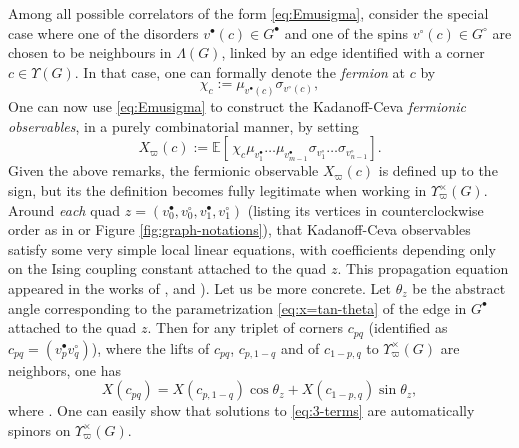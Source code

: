 \documentclass[reqno]{amsart}
\numberwithin{equation}{section}
\theoremstyle{definition}
\theoremstyle{remark}
\newcommand\E{\mathbb{E}}
\begin{document}
Among all possible correlators of the form \eqref{eq:Emusigma}, consider the special case where one of the disorders $v^\bullet(c)\in G^\bullet$ and one of the spins $v^\circ(c)\in G^\circ$ are chosen to be neighbours in $\Lambda(G)$, linked by an edge identified with a corner $c \in \Upsilon(G)$. In that case, one can formally denote the \emph{fermion} at $c$ by
\begin{equation}
\label{eq:KC-chi-def}
\chi_c:=\mu_{v^\bullet(c)}\sigma_{v^\circ(c)},
\end{equation}
One can now use \eqref{eq:Emusigma} to construct the Kadanoff-Ceva \emph{fermionic observables}, in a purely combinatorial manner, by setting
\begin{equation}
\label{eq:KC-fermions}
X_{\varpi}(c):=\E[\,\chi_c \mu_{v_1^\bullet}\ldots\mu_{v_{m-1}^\bullet}\sigma_{v_1^\circ}\ldots\sigma_{v_{n-1}^\circ} ].
\end{equation}
 Given the above remarks, the fermionic observable $X_\varpi(c)$ is defined up to the sign, but its the definition becomes fully legitimate when working in $\Upsilon^\times_\varpi(G)$. Around \emph{each} quad $z=(v_0^\bullet,v_0^\circ,v_1^\bullet,v_1^\circ)$ (listing its vertices in counterclockwise order as in \cite[Figure 3.A]{Che20} or Figure \ref{fig:graph-notations}), that Kadanoff-Ceva observables satisfy some very simple local linear equations, with coefficients depending only on the Ising coupling constant attached to the quad $z$. This propagation equation appeared in the works of \cite{dotsenko1983critical}, \cite{perk1980quadratic} and \cite[Section 4.3]{Mercat-CMP}). Let us be more concrete. Let $\theta_z$ be the abstract angle corresponding to the parametrization \eqref{eq:x=tan-theta} of the edge in $G^{\bullet}$ attached to the quad $z$. Then for any triplet of corners $c_{pq}$ (identified as $c_{pq}=(v^\bullet_p v^\circ_q)$), where the lifts of $c_{pq}$, $c_{p,1-q}$ and of $c_{1-p,q}$ to $\Upsilon^\times_\varpi(G)$ are neighbors, one has
 \begin{equation}
\label{eq:3-terms}
X(c_{pq})=X(c_{p,1-q})\cos\theta_z+X(c_{1-p,q})\sin\theta_z,
\end{equation}
where . One can easily show that solutions to \eqref{eq:3-terms} are automatically spinors on $\Upsilon^\times_\varpi(G)$.

\medskip
\end{document}
